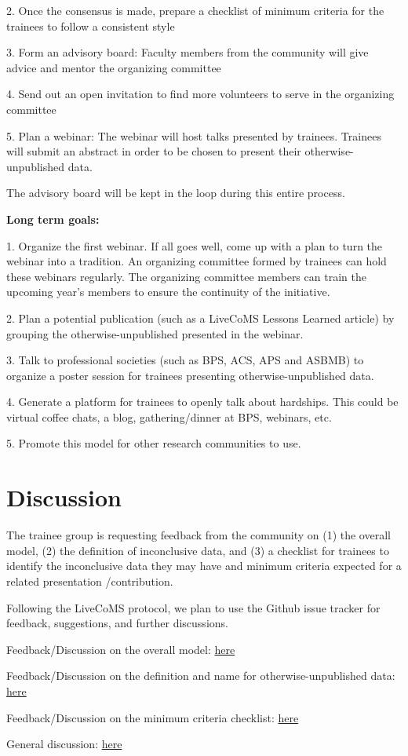 \documentclass[9pt,lessons]{livecoms}
\theoremstyle{definition}
\theoremstyle{remark}
\begin{document}
2. Once the consensus is made, prepare a checklist of minimum criteria for the trainees to follow a consistent style

3. Form an advisory board: Faculty members from the community will give advice and mentor the organizing committee

4. Send out an open invitation to find more volunteers to serve in the organizing committee

5. Plan a webinar: The webinar will host talks presented by trainees. Trainees will submit an abstract in order to be chosen to present their otherwise-unpublished data. 

The advisory board will be kept in the loop during this entire process.

\textbf{Long term goals:}

1. Organize the first webinar. If all goes well, come up with a plan to turn the webinar into a tradition. An organizing committee formed by trainees can hold these 
webinars regularly. The organizing committee members can train the upcoming year’s members to ensure the continuity of the initiative.

2. Plan a potential publication (such as a LiveCoMS Lessons Learned article) by grouping the otherwise-unpublished presented in the webinar.

3. Talk to professional societies (such as BPS, ACS, APS and ASBMB) to organize a poster session for trainees presenting otherwise-unpublished data.

4. Generate a platform for trainees to openly talk about hardships. This could be virtual coffee chats, a blog, gathering/dinner at BPS, webinars, etc.  

5. Promote this model for other research communities to use.


\section{Discussion}

The trainee group is requesting feedback from the community on (1) the overall model, (2) the definition of inconclusive data, and (3) a checklist for trainees to 
identify the inconclusive data they may have and minimum criteria expected for a related presentation /contribution.

Following the LiveCoMS protocol, we plan to use the Github issue tracker for feedback, suggestions, and further discussions.

Feedback/Discussion on the overall model: \href{https://github.com/Poruthoor/NegativeDataInitiative/issues/2}{here}

Feedback/Discussion on the definition and name for otherwise-unpublished data: \href{https://github.com/Poruthoor/NegativeDataInitiative/issues/3}{here} 

Feedback/Discussion on the minimum criteria checklist: \href{https://github.com/Poruthoor/NegativeDataInitiative/issues/4}{here} 

General discussion: \href{https://github.com/Poruthoor/NegativeDataInitiative/issues/5}{here} 
\end{document}
